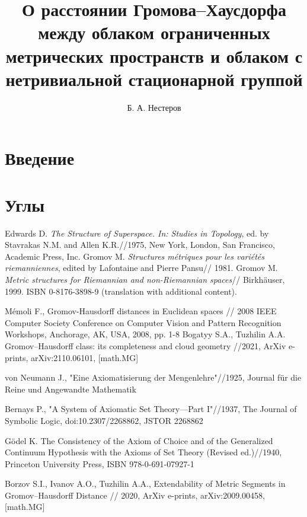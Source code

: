 \documentclass[11pt,twoside,draft
]{article}
\title
{%
О расстоянии Громова--Хаусдорфа между облаком ограниченных метрических пространств и облаком с нетривиальной стационарной группой 
}
{%
On the Gromov--Hausdorff distance between the cloud of bounded
metric spaces and a cloud with nontrivial stabilizer}
\author
{%
Б. А. Нестеров}
{%
B. A. Nesterov}
\begin{document}
\maketitle
\newpage

\section{Введение}  


\section{Углы}  

\begin{thebibliography}{99}

	 Edwards D. \emph{The Structure of Superspace. In: Studies in Topology}, ed. by Stavrakas N.M. and Allen K.R.//1975, New York, London, San Francisco, Academic Press, Inc.
	 Gromov M. \emph{Structures m\'etriques pour les vari\'et\'es riemanniennes}, edited by Lafontaine and Pierre Pansu// 1981.
	 Gromov M. \emph{Metric structures for Riemannian and non-Riemannian spaces}// Birkh\"auser, 1999. ISBN 0-8176-3898-9 (translation with additional content).


	Mémoli F., Gromov-Hausdorff distances in Euclidean spaces // 2008 IEEE Computer Society Conference on Computer Vision and Pattern Recognition Workshops, Anchorage, AK, USA, 2008, pp. 1-8
	Bogatyy S.A., Tuzhilin A.A. Gromov–Hausdorff class: its completeness and cloud geometry //2021, ArXiv e-prints,
	arXiv:2110.06101, [math.MG]

	von Neumann J., "Eine Axiomatisierung der Mengenlehre"//1925, Journal für die Reine und Angewandte Mathematik

	Bernays P., "A System of Axiomatic Set Theory—Part I"//1937, The Journal of Symbolic Logic, doi:10.2307/2268862, JSTOR 2268862

	Gödel K. The Consistency of the Axiom of Choice and of the Generalized Continuum Hypothesis with the Axioms of Set Theory (Revised ed.)//1940, Princeton University Press,  ISBN 978-0-691-07927-1

	Borzov S.I., Ivanov A.O., Tuzhilin A.A., Extendability of Metric Segments in
	Gromov–Hausdorff Distance // 2020, ArXiv e-prints,
	arXiv:2009.00458, [math.MG]


\end{thebibliography}
\end{document}
